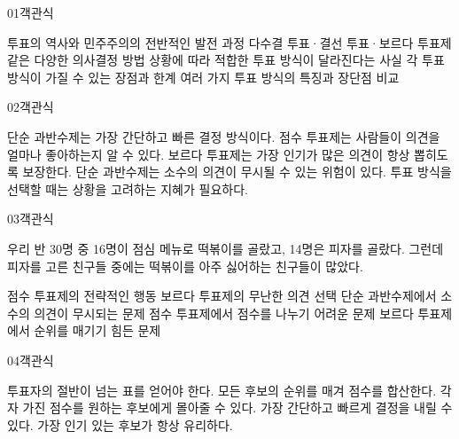 \documentclass[fs85,seriesRus]{korfarm-base}
\begin{document}
\par\medskip
\kfBeginMC
\begin{kfQBlock}{01}{객관식}
\begin{kfChoices}
\kfChoice 투표의 역사와 민주주의의 전반적인 발전 과정
\kfChoice 다수결 투표·결선 투표·보르다 투표제 같은 다양한 의사결정 방법
\kfChoice 상황에 따라 적합한 투표 방식이 달라진다는 사실
\kfChoice 각 투표 방식이 가질 수 있는 장점과 한계
\kfChoice 여러 가지 투표 방식의 특징과 장단점 비교
\end{kfChoices}
\end{kfQBlock}
\begin{kfQBlock}{02}{객관식}
\begin{kfChoices}
\kfChoice 단순 과반수제는 가장 간단하고 빠른 결정 방식이다.
\kfChoice 점수 투표제는 사람들이 의견을 얼마나 좋아하는지 알 수 있다.
\kfChoice 보르다 투표제는 가장 인기가 많은 의견이 항상 뽑히도록 보장한다.
\kfChoice 단순 과반수제는 소수의 의견이 무시될 수 있는 위험이 있다.
\kfChoice 투표 방식을 선택할 때는 상황을 고려하는 지혜가 필요하다.
\end{kfChoices}
\end{kfQBlock}
\begin{kfQBlock}{03}{객관식}
\begin{kfEvidence}우리 반 30명 중 16명이 점심 메뉴로 떡볶이를 골랐고, 14명은 피자를 골랐다. 그런데 피자를 고른 친구들 중에는 떡볶이를 아주 싫어하는 친구들이 많았다.\end{kfEvidence}
\begin{kfChoices}
\kfChoice 점수 투표제의 전략적인 행동
\kfChoice 보르다 투표제의 무난한 의견 선택
\kfChoice 단순 과반수제에서 소수의 의견이 무시되는 문제
\kfChoice 점수 투표제에서 점수를 나누기 어려운 문제
\kfChoice 보르다 투표제에서 순위를 매기기 힘든 문제
\end{kfChoices}
\end{kfQBlock}
\begin{kfQBlock}{04}{객관식}
\begin{kfChoices}
\kfChoice 투표자의 절반이 넘는 표를 얻어야 한다.
\kfChoice 모든 후보의 순위를 매겨 점수를 합산한다.
\kfChoice 각자 가진 점수를 원하는 후보에게 몰아줄 수 있다.
\kfChoice 가장 간단하고 빠르게 결정을 내릴 수 있다.
\kfChoice 가장 인기 있는 후보가 항상 유리하다.
\end{kfChoices}
\end{kfQBlock}
\end{document}
